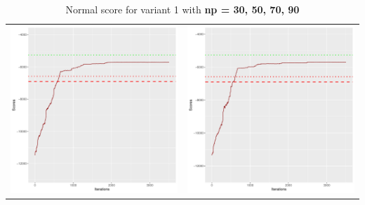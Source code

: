 \documentclass[]{scrartcl}
\begin{document}
\begin{table}[h!]
\begin{tabular}{cc}
\includegraphics[scale = 0.4]{./figs/alarm/v1/70/boundsEvolution-3502.pdf} & 
\includegraphics[scale = 0.4]{./figs/alarm/v1/90/boundsEvolution-3502.pdf} \\
\end{tabular}
\caption{Normal score for variant 1 with \textbf{np =  30, 50, 70, 90 }}
\end{table}
\end{document}
